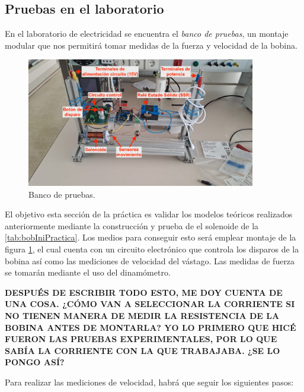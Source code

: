 \subsection*{Pruebas en el laboratorio}

En el laboratorio de electricidad se encuentra el \textit{banco de pruebas}, un montaje modular que nos permitirá tomar medidas de la fuerza y velocidad de la bobina.

\begin{figure}[H]
    \centering
    \includegraphics[width=10cm]{FigurasMemoria/prototipoFinalPractica.jpeg}
    \caption{Banco de pruebas.}
    \label{fig:prototipoFinalPractica} %
\end{figure}

El objetivo esta sección de la práctica es validar los modelos teóricos realizados anteriormente mediante la construcción y prueba de el solenoide de la \ref{tab:bobIniPractica}. Los medios para conseguir esto será emplear montaje de la figura \ref{fig:prototipoFinalPractica}, el cual cuenta con un circuito electrónico que controla los disparos de la bobina así como las mediciones de velocidad del vástago. Las medidas de fuerza se tomarán mediante el uso del dinamómetro.

\textbf{DESPUÉS DE ESCRIBIR TODO ESTO, ME DOY CUENTA DE UNA COSA. ¿CÓMO VAN A SELECCIONAR LA CORRIENTE SI NO TIENEN MANERA DE MEDIR LA RESISTENCIA DE LA BOBINA ANTES DE MONTARLA? YO LO PRIMERO QUE HICÉ FUERON LAS PRUEBAS EXPERIMENTALES, POR LO QUE SABÍA LA CORRIENTE CON LA QUE TRABAJABA. ¿SE LO PONGO ASÍ?}

Para realizar las mediciones de velocidad, habrá que seguir los siguientes pasos:



